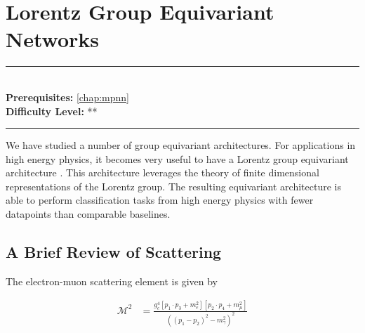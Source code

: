 \documentclass[book.tex]{subfiles}
\begin{document}
\chapter{Lorentz Group Equivariant Networks}

\label{chap:lorentz_equivariant}
\noindent\rule{11cm}{0.4pt} \\
\textbf{Prerequisites:} \autoref{chap:mpnn} \\
\textbf{Difficulty Level:} ** \\
\noindent\rule{11cm}{0.4pt}
\vspace{5mm}

We have studied a number of group equivariant architectures. For applications in high energy physics, it becomes very useful to have a Lorentz group equivariant architecture \cite{bogatskiy2020lorentz}. This architecture leverages the theory of finite dimensional representations of the Lorentz group. The resulting equivariant architecture is able to perform classification tasks from high energy physics with fewer datapoints than comparable baselines.


\section{A Brief Review of Scattering}

The electron-muon scattering element is given by

\begin{align}
    \mathcal{M}^2 &= \frac{g_c^4[p_1\cdot p_3 +m_e^2][p_2\cdot p_4 + m_{\mu}^2]}{((p_1-p_2)^2 -m_{\gamma}^2)^2}
\end{align}
\end{document}
